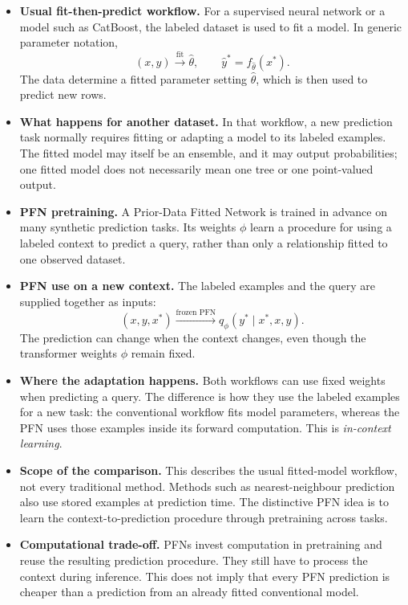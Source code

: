 \documentclass[11pt]{article}
\newenvironment{notes}
  {\begin{itemize}\setlength{\itemsep}{0.45em}\setlength{\parsep}{0pt}}
  {\end{itemize}}
\begin{document}
\begin{notes}
    \item \textbf{Usual fit-then-predict workflow.} For a supervised
    neural network or a model such as CatBoost, the labeled dataset
    is used to fit a model. In generic parameter notation,
    \[
        (x,y)\xrightarrow{\text{fit}}\widehat\theta,
        \qquad
        \widehat y^\ast=f_{\widehat\theta}(x^\ast).
    \]
    The data determine a fitted parameter setting
    \(\widehat\theta\), which is then used to predict new rows.

    \item \textbf{What happens for another dataset.} In that workflow,
    a new prediction task normally requires fitting or adapting a
    model to its labeled examples. The fitted model may itself be
    an ensemble, and it may output probabilities; one fitted model
    does not necessarily mean one tree or one point-valued output.

    \item \textbf{PFN pretraining.} A Prior-Data Fitted Network is
    trained in advance on many synthetic prediction tasks. Its
    weights \(\phi\) learn a procedure for using a labeled context
    to predict a query, rather than only a relationship fitted to
    one observed dataset.

    \item \textbf{PFN use on a new context.} The labeled examples and
    the query are supplied together as inputs:
    \[
        (x,y,x^\ast)
        \xrightarrow{\text{frozen PFN}}
        q_\phi(y^\ast\mid x^\ast,x,y).
    \]
    The prediction can change when the context changes, even though
    the transformer weights \(\phi\) remain fixed.

    \item \textbf{Where the adaptation happens.} Both workflows can
    use fixed weights when predicting a query. The difference is how
    they use the labeled examples for a new task: the conventional
    workflow fits model parameters, whereas the PFN uses those
    examples inside its forward computation. This is
    \emph{in-context learning}.

    \item \textbf{Scope of the comparison.} This describes the usual
    fitted-model workflow, not every traditional method. Methods
    such as nearest-neighbour prediction also use stored examples
    at prediction time. The distinctive PFN idea is to learn the
    context-to-prediction procedure through pretraining across tasks.

    \item \textbf{Computational trade-off.} PFNs invest computation
    in pretraining and reuse the resulting prediction procedure.
    They still have to process the context during inference.
    This does not imply that every PFN prediction is cheaper than
    a prediction from an already fitted conventional model.
\end{notes}
\end{document}
